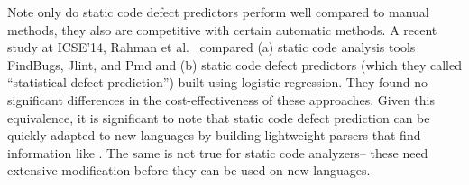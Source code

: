 Note only do static code defect predictors perform well compared to manual methods,
they also are competitive with certain automatic methods.
A recent study at ICSE'14, Rahman et al.~\cite{rahman14:icse} compared
(a) static code analysis tools FindBugs, Jlint, and Pmd and (b)
static code defect predictors
(which they called ``statistical defect prediction'') built using logistic regression.
They found  no significant differences in the cost-effectiveness
of these  approaches. Given this equivalence, it is significant to note that 
static code defect prediction can be quickly adapted to new languages by building lightweight
parsers that find   information like . The same is not true for   static code analyzers-- these need  extensive modification before they can be used on new
languages.

